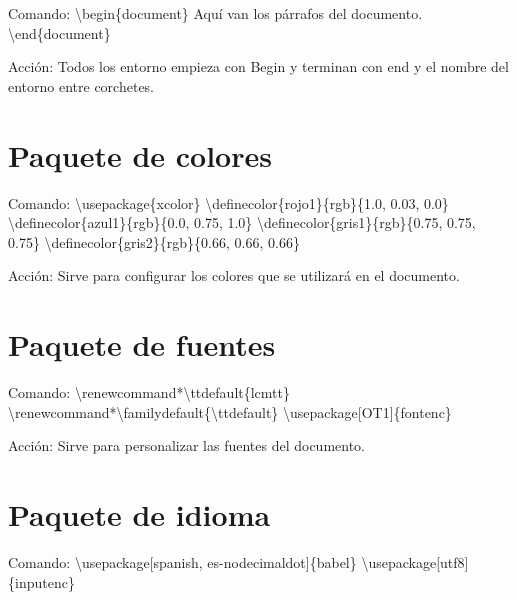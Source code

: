 \documentclass[a4paper, 12pt]{article}
\begin{document}
\begin{flushleft}
		Comando: \textbackslash begin\{document\}\newline
		Aquí van los párrafos del documento.\newline
		\textbackslash end\{document\}\newline
			
		Acción: Todos los entorno empieza con Begin y terminan con end y el nombre del entorno entre corchetes.\newline
		
		\section{Paquete de colores}
		
		Comando: \textbackslash usepackage\{xcolor\}\newline
		\textbackslash definecolor\{rojo1\}\{rgb\}\{1.0, 0.03, 0.0\}\newline
		\textbackslash definecolor\{azul1\}\{rgb\}\{0.0, 0.75, 1.0\}\newline
		\textbackslash definecolor\{gris1\}\{rgb\}\{0.75, 0.75, 0.75\}\newline
		\textbackslash definecolor\{gris2\}\{rgb\}\{0.66, 0.66, 0.66\}\newline
			
		Acción: Sirve para configurar los colores que se utilizará en el documento.\newline
		
		\section{Paquete de fuentes}
			
		Comando: \textbackslash renewcommand*\textbackslash ttdefault\{lcmtt\}\newline
		\textbackslash renewcommand*\textbackslash familydefault\{\textbackslash ttdefault\}\newline
		\textbackslash usepackage[OT1]\{fontenc\}\newline
			
		Acción: Sirve para personalizar las fuentes del documento.\newline
		
		\section{Paquete de idioma}
			
		Comando: \textbackslash usepackage[spanish, es-nodecimaldot]\{babel\}\newline
		\textbackslash usepackage[utf8]\{inputenc\}\newline
			

\end{flushleft}
\end{document}
